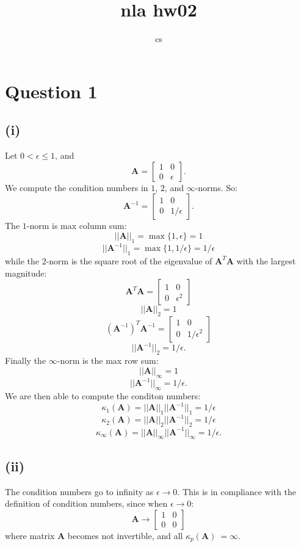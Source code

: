 \documentclass[10pt]{article}
\title{nla hw02}
\author{cs}
\newcommand{\mat}[1]{\mathbf{#1}}
\begin{document}
\maketitle

\section{Question 1}

\subsection{(i)}
Let $0<\epsilon\leq1$, and
$$\mat{A}=\begin{bmatrix}
    1 & 0 \\
    0 & \epsilon
\end{bmatrix}.$$
We compute the condition numbers in $1$, $2$, and $\infty$-norms. So:
$$\mat{A}^{-1}=\begin{bmatrix}
    1 & 0 \\
    0 & 1/\epsilon
\end{bmatrix}.$$
The $1$-norm is max column sum:
$$||\mat{A}||_1=\max\{1,\epsilon\}=1$$
$$||\mat{A}^{-1}||_1=\max\{1,1/\epsilon\}=1/\epsilon$$
while the $2$-norm is the square root of the eigenvalue of $\mat{A}^T\mat{A}$
with the largest magnitude:
$$\mat{A}^T\mat{A}=\begin{bmatrix}
    1 & 0 \\
    0 & \epsilon^2
\end{bmatrix}$$
$$||\mat{A}||_2=1$$
$$(\mat{A}^{-1})^T\mat{A}^{-1}=\begin{bmatrix}
    1 & 0 \\
    0 & 1/\epsilon^2
\end{bmatrix}$$
$$||\mat{A}^{-1}||_2=1/\epsilon.$$
Finally the $\infty$-norm is the max row sum:
$$||\mat{A}||_\infty=1$$
$$||\mat{A}^{-1}||_\infty=1/\epsilon.$$
We are then able to compute the conditon numbers:
$$\kappa_1(\mat{A})=||\mat{A}||_1 ||\mat{A}^{-1}||_1=1/\epsilon$$
$$\kappa_2(\mat{A})=||\mat{A}||_2 ||\mat{A}^{-1}||_2=1/\epsilon$$
$$\kappa_\infty(\mat{A})
=||\mat{A}||_\infty ||\mat{A}^{-1}||_\infty=1/\epsilon.$$

\subsection{(ii)}
The condition numbers go to infinity as $\epsilon\rightarrow0$. This is in
compliance with the definition of condition numbers, since when
$\epsilon\rightarrow0$:
$$\mat{A}\rightarrow\begin{bmatrix}
    1 & 0 \\
    0 & 0
\end{bmatrix}$$
where matrix $\mat{A}$ becomes not invertible, and all $\kappa_p(\mat{A})\
=\infty$.
\end{document}
